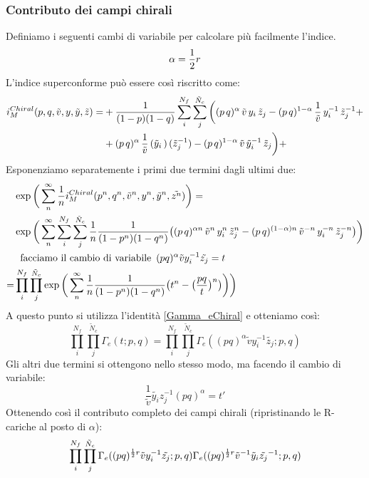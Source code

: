 \documentclass[a4paper,12pt]{article}
\begin{document}
\subsubsection{Contributo dei campi chirali}
Definiamo i seguenti cambi di variabile per calcolare più facilmente l'indice.
$$
	\alpha = {1 \over 2 } r  
$$
	L'indice superconforme può essere così riscritto come:
\begin{align*}
 i_M^{Chiral}  (p,q, \tilde v, y,\tilde y ,\tilde z) = &
 +{1\over (1-p)(1-q)} \sum_i^{N_f}\sum_j^{\tilde N_c} \bigg( (p\,q)^{\alpha} \,\tilde v \, y_i\, \tilde z_j
- (p\,q)^{1- \alpha} \, {1 \over \tilde v}\, y_i^{-1} \,   
\tilde z_j^{-1} + \\
& + (p\,q)^{\alpha}\, {1\over \tilde v}\, 
({\tilde y_i}\,) \,  
(\tilde z_j^{-1})
- (p\,q)^{1- \alpha} \, \tilde v \, 
{\tilde y_i}^{-1} \, 
\tilde z_j \bigg) + \\
\end{align*}
Esponenziamo separatemente i primi due termini dagli ultimi due:
\begin{align*} 
&\exp \bigg( \sum_{n}^{\infty} \frac{1}{n} i_M^{Chiral} (p^n,q^n, \tilde v^n, y^n,\tilde y^n ,\tilde{z^n} ) \bigg)  = \\
& \exp \bigg( \sum_{n}^{\infty} \sum_i^{N_f}\sum_j^{\tilde N_c}  \frac{1}{n}    {1\over (1-p^n)(1-q^n)} \big( (p \, q)^{\alpha n} \,\tilde v^n \, y_i^n\, \tilde z_j^n
- (p\,q)^{(1- \alpha)n} \, \tilde v^{-n}\, y_i^{-n} \,   
\tilde z_j^{-n} \big) \bigg) \\
& \; \mbox{ facciamo il cambio di variabile } \, (pq)^{\alpha} \tilde{v} y_i^{-1} \tilde{z_j} = t \\
=& \prod_i^{N_f}\prod_j^{\tilde N_c}  \exp \bigg( \sum_{n}^{\infty} \frac{1}{n}   {1\over (1-p^n)(1-q^n)} \big( t^n - \big( \frac{pq}{t} \big)^n \big) \bigg) \bigg)
\end{align*}
A questo punto si utilizza l'identità \ref{Gamma_eChiral} e otteniamo così:
\begin{equation}
	\prod_i^{N_f}\prod_j^{\tilde N_c} \Gamma_e ( t ; p,q) = \prod_i^{N_f}\prod_j^{\tilde N_c} \Gamma_e ( (pq)^{\alpha} \tilde{v} y_i^{-1} \tilde{z_j} ; p,q)
\end{equation}
Gli altri due termini si ottengono nello stesso modo, ma facendo il cambio di variabile:
$$
	\frac{1}{\tilde v } \tilde{y_i} z_j^{-1} (pq)^{\alpha} = t'
$$
Ottenendo così il contributo completo dei campi chirali (ripristinando le R-cariche al posto di $\alpha$):
\begin{equation}
\prod_i^{N_f}\prod_j^{\tilde N_c} \Gamma_e ( (pq)^{{1 \over 2 } r} \tilde{v} y_i^{-1} \tilde{z_j} ; p,q)\Gamma_e ( (pq)^{{1 \over 2 } r} \tilde{v}^{-1} \tilde y_i \tilde{z_j}^{-1} ; p,q)
\end{equation}
\end{document}
